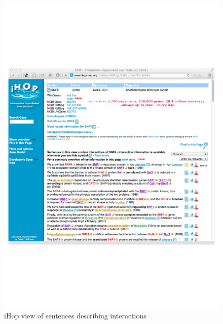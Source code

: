 \begin{figure}
\begin{center}
\includegraphics[scale=0.6]{figures/ihop-2.pdf}
 \caption{iHop view of sentences describing interactions}
\label{fig:ihop-2}
\end{center}
\end{figure}

